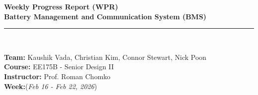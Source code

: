 \documentclass[12pt]{article}
\begin{document}
\begin{center}
    {\Large \textbf{Weekly Progress Report (WPR)}} \\[6pt]
    {\large \textbf{Battery Management and Communication System (BMS)}} \\[2pt]
    \rule{0.8\textwidth}{0.5pt} \\[6pt]
\end{center}

\noindent
\textbf{Team:} Kaushik Vada, Christian Kim, Connor Stewart, Nick Poon \\[3pt]
\textbf{Course:} EE175B - Senior Design II \\
\textbf{Instructor:} Prof. Roman Chomko \\
\textbf{Week:}(\textit{Feb 16 - Feb 22, 2026}) \\[8pt]

\vspace{1em}
\end{document}
